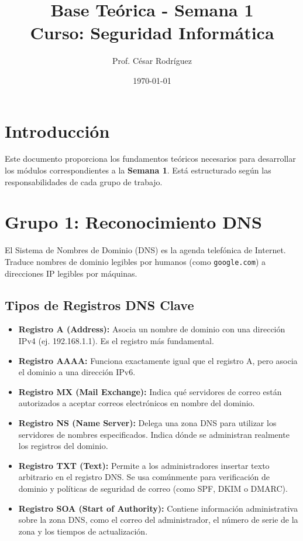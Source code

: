 \documentclass[12pt,a4paper]{article}
\title{Base Teórica - Semana 1 \\ \large Curso: Seguridad Informática}
\author{Prof. César Rodríguez}
\date{\today}
\begin{document}
\maketitle

\tableofcontents
\newpage

\section*{Introducción}
Este documento proporciona los fundamentos teóricos necesarios para desarrollar los módulos correspondientes a la \textbf{Semana 1}. Está estructurado según las responsabilidades de cada grupo de trabajo.

\section{Grupo 1: Reconocimiento DNS}
El Sistema de Nombres de Dominio (DNS) es la agenda telefónica de Internet. Traduce nombres de dominio legibles por humanos (como \texttt{google.com}) a direcciones IP legibles por máquinas.

\subsection{Tipos de Registros DNS Clave}
\begin{itemize}[label=$\bullet$]
    \item \textbf{Registro A (Address):} Asocia un nombre de dominio con una dirección IPv4 (ej. 192.168.1.1). Es el registro más fundamental.
    \item \textbf{Registro AAAA:} Funciona exactamente igual que el registro A, pero asocia el dominio a una dirección IPv6.
    \item \textbf{Registro MX (Mail Exchange):} Indica qué servidores de correo están autorizados a aceptar correos electrónicos en nombre del dominio.
    \item \textbf{Registro NS (Name Server):} Delega una zona DNS para utilizar los servidores de nombres especificados. Indica dónde se administran realmente los registros del dominio.
    \item \textbf{Registro TXT (Text):} Permite a los administradores insertar texto arbitrario en el registro DNS. Se usa comúnmente para verificación de dominio y políticas de seguridad de correo (como SPF, DKIM o DMARC).
    \item \textbf{Registro SOA (Start of Authority):} Contiene información administrativa sobre la zona DNS, como el correo del administrador, el número de serie de la zona y los tiempos de actualización.
\end{itemize}
\end{document}
